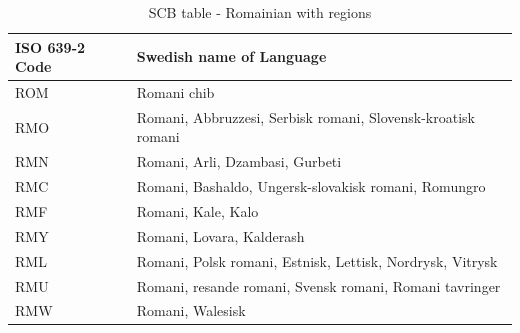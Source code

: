 \begin{table}[!htp]
    \caption{SCB table - Romainian with regions}
    \label{tab:SCBromani}
    \begin{tabular}{L{3cm}|L{6.5cm}}
      \textbf{ISO 639-2 Code} &\textbf{Swedish name of Language}\\
      \hline
ROM &   Romani chib\\
RMO &   Romani, Abbruzzesi, Serbisk romani, Slovensk-kroatisk romani\\
RMN &   Romani, Arli, Dzambasi, Gurbeti\\
RMC &   Romani, Bashaldo, Ungersk-slovakisk romani, Romungro\\
RMF &   Romani, Kale, Kalo\\
RMY &   Romani, Lovara, Kalderash\\
RML &   Romani, Polsk romani, Estnisk, Lettisk, Nordrysk, Vitrysk\\
RMU &   Romani, resande romani, Svensk romani, Romani tavringer\\
RMW &   Romani, Walesisk\\
\end{tabular}
\end{table}

